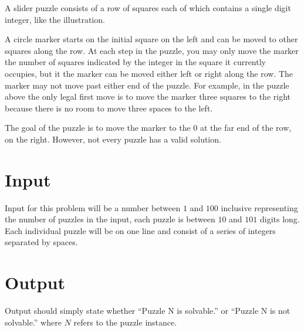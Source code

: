 
A slider puzzle consists of a row of squares each of which contains a
single digit integer, like the illustration.

A circle marker starts on the initial square on the left and can be
moved to other squares along the row. At each step in the puzzle, you
may only move the marker the number of squares indicated by the integer
in the square it currently occupies, but it the marker can be moved 
either left or right along the row. The marker may not move past either 
end of the puzzle. For example, in the puzzle above the only legal 
first move is to move the marker three squares to the right because 
there is no room to move three spaces to the left.

The goal of the puzzle is to move the marker to the 0 at the far end of
the row, on the right. However, not every puzzle has a valid solution.

\section*{Input}
Input for this problem will be a number between $1$ and $100$ inclusive
representing the number of puzzles in the input, each puzzle is between
$10$ and $101$ digits long. Each individual puzzle will be on one line and
consist of a series of integers separated by spaces. 

\section*{Output}
Output should simply state whether ``Puzzle N is solvable.'' or 
``Puzzle N is not solvable.'' where $N$ refers to the puzzle instance.

